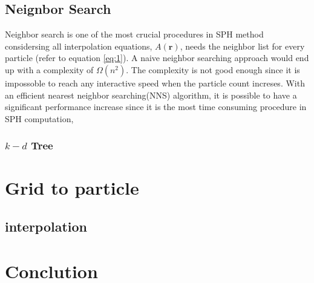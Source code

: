     \subsection{Neignbor Search}
    Neighbor search is one of the most crucial procedures in SPH method considersing all interpolation equations, $A(\textbf{r})$, needs the neighbor list for every particle (refer to equation \ref{eq:1}). A naive neighbor searching approach would end up with a complexity of $\Omega(n^2)$. The complexity is not good enough since it is impossoble to reach any interactive speed when the particle count increses. With an efficient nearest neighbor searching(NNS) algorithm, it is possible to have a significant performance increase since it is the most time consuming procedure in SPH computation,

        \subsubsection{$k-d$ Tree}
            


\section{Grid to particle}
    \subsection{interpolation}

\section{Conclution}